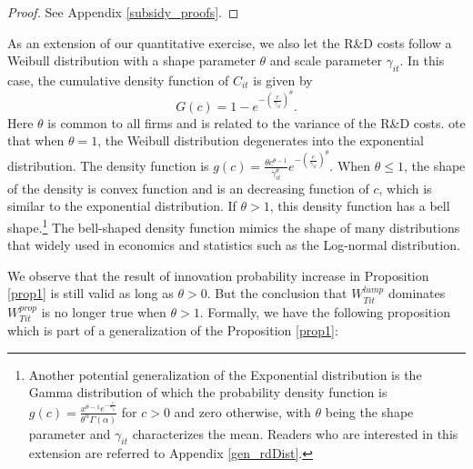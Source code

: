 \documentclass[11pt]{article}
\begin{document}
\begin{proof}
    See Appendix \ref{subsidy_proofs}.
\end{proof}
As an extension of our quantitative exercise, we also let the R\&D costs follow a Weibull distribution with a shape parameter $\theta$ and scale parameter $\gamma_{it}$. In this case, the cumulative density function of $C_{it}$ is given by 
\begin{equation} \label{cdf_weibull}
    G(c) = 1-e^{-\left(\frac{c}{\gamma_{it}}\right)^\theta}.
\end{equation}
Here $\theta$ is common to all firms and is related to the variance of the R\&D costs. ote that when $\theta=1$, the Weibull distribution degenerates into the exponential distribution. The density function is $g(c) = \frac{\theta c^{\theta-1}}{\gamma_{it}^\theta}e^{-\left(\frac{c}{\gamma_{it}}\right)^\theta}$. When $\theta \leq 1$, the shape of the density is convex function and is an decreasing function of $c$, which is similar to the exponential distribution. If $\theta >1$, this density function has a bell shape.\footnote{Another potential generalization of the Exponential distribution is the Gamma distribution of which the probability density function is $g(c)=\frac{x^{\theta-1}e^{-\frac{c}{\gamma_{it}}}}{\theta ^\alpha \Gamma(\alpha)}$ for $c>0$ and zero otherwise, with $\theta$ being the shape parameter and $\gamma_{it}$ characterizes the mean. Readers who are interested in this extension are referred to Appendix \ref{gen_rdDist}.} The bell-shaped density function mimics the shape of many distributions that widely used in economics and statistics such as the Log-normal distribution. 

We observe that the result of innovation probability increase in Proposition \ref{prop1} is still valid as long as $\theta>0$. But the conclusion that $W_{Tit}^{lump}$ dominates $W_{Tit}^{prop}$ is no longer true when $\theta>1$. Formally, we have the following proposition which is part of a generalization of the Proposition \ref{prop1}:
\end{document}
